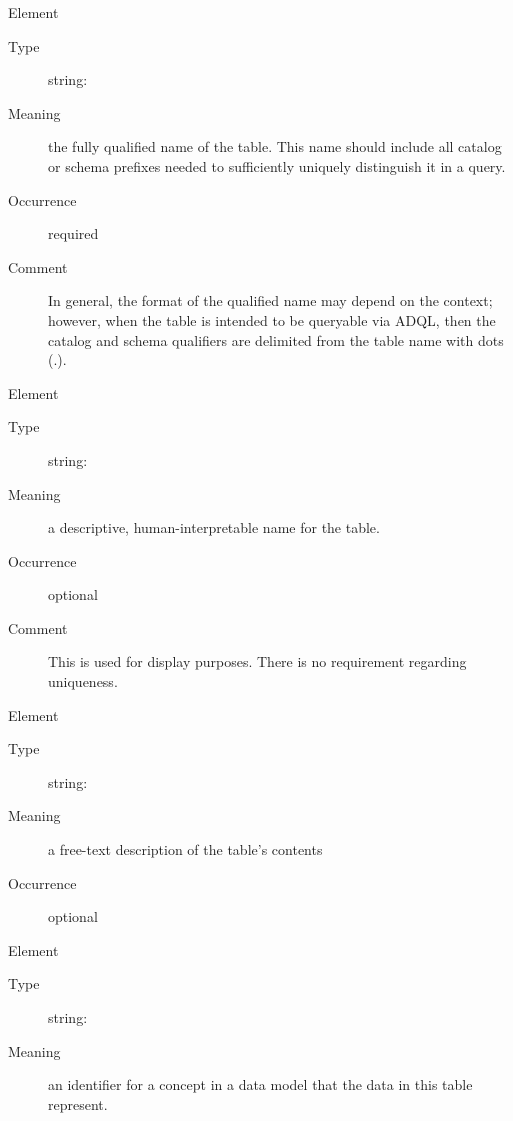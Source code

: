 \documentclass[11pt,a4paper]{ivoa}
\begin{document}
\begin{generated}
\begingroup\small\begin{bigdescription}\item[Element \xmlel{name}]
\begin{description}
\item[Type] string: 
\item[Meaning] 
                  the fully qualified name of the table.  This name 
                  should include all catalog or schema prefixes
                  needed to sufficiently uniquely distinguish it in a
                  query.  
               
\item[Occurrence] required
\item[Comment] 
                  In general, the format of the qualified name may
                  depend on the context; however, when the
                  table is intended to be queryable via ADQL, then the
                  catalog and schema qualifiers are delimited from the
                  table name with dots (.).  
               

\end{description}
\item[Element \xmlel{title}]
\begin{description}
\item[Type] string: 
\item[Meaning] 
                  a descriptive, human-interpretable name for the table.
               
\item[Occurrence] optional
\item[Comment] 
                  This is used for display purposes.  There is no requirement
                  regarding uniqueness.  
               

\end{description}
\item[Element \xmlel{description}]
\begin{description}
\item[Type] string: 
\item[Meaning] 
                  a free-text description of the table's contents
               
\item[Occurrence] optional

\end{description}
\item[Element \xmlel{utype}]
\begin{description}
\item[Type] string: 
\item[Meaning] 
                  an identifier for a concept in a data model that
                  the data in this table represent.  
               

\end{description}
\end{bigdescription}
\end{generated}
\end{document}
